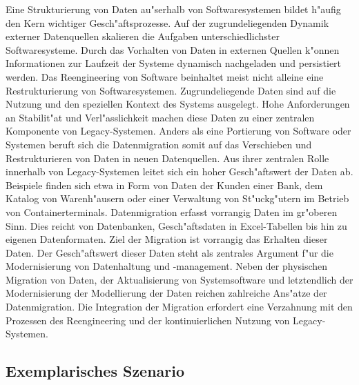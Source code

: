 Eine Strukturierung von Daten au"serhalb von Softwaresystemen bildet h"aufig den Kern wichtiger Gesch"aftsprozesse. Auf der zugrundeliegenden Dynamik externer Datenquellen skalieren die Aufgaben unterschiedlichster Softwaresysteme. Durch das Vorhalten von Daten in externen Quellen k"onnen Informationen zur Laufzeit der Systeme dynamisch nachgeladen und persistiert werden.
\lb
Das Reengineering von Software beinhaltet meist nicht alleine eine Restrukturierung von Softwaresystemen. Zugrundeliegende Daten sind auf die Nutzung und den speziellen Kontext des Systems ausgelegt. Hohe Anforderungen an Stabilit"at und Verl"asslichkeit machen diese Daten zu einer zentralen Komponente von Legacy-Systemen.
\lb
Anders als eine Portierung von Software oder Systemen beruft sich die Datenmigration somit auf das Verschieben und Restrukturieren von Daten in neuen Datenquellen.
\lb
Aus ihrer zentralen Rolle innerhalb von Legacy-Systemen leitet sich ein hoher Gesch"aftswert der Daten ab. Beispiele finden sich etwa in Form von Daten der Kunden einer Bank, dem Katalog von Warenh"ausern oder einer Verwaltung von St"uckg"utern im Betrieb von Containerterminals. 
\lb
Datenmigration erfasst vorrangig Daten im gr"oberen Sinn. Dies reicht von Datenbanken, Gesch"aftsdaten in Excel-Tabellen bis hin zu eigenen Datenformaten. Ziel der Migration ist vorrangig das Erhalten dieser Daten. Der Gesch"aftswert dieser Daten steht als zentrales Argument f"ur die Modernisierung von Datenhaltung und -management. Neben der physischen Migration von Daten, der Aktualisierung von Systemsoftware und letztendlich der Modernisierung der Modellierung der Daten reichen zahlreiche Ans"atze der Datenmigration. Die Integration der Migration erfordert eine Verzahnung mit den Prozessen des Reengineering und der kontinuierlichen Nutzung von Legacy-Systemen.

\subsection{Exemplarisches Szenario}

\label{ref:scenario}

